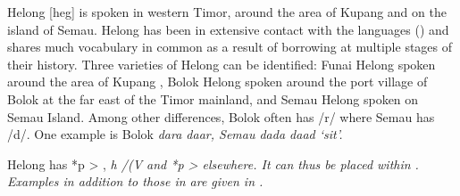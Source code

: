 Helong [heg] is spoken in western Timor,
around the area of Kupang
and on the island of Semau.
Helong has been in extensive contact with the 
languages () and shares much vocabulary in
common as a result of borrowing
at multiple stages of their history.
Three varieties of Helong can be identified: Funai Helong spoken
around the area of Kupang \citep{Edwards2018b},
Bolok Helong spoken around the port village of Bolok at the far
east of the Timor mainland,
and Semau Helong spoken on Semau Island.
Among other differences, Bolok often has /r/
where Semau has /d/. One example is Bolok
\it{dara {\tl} daar}, Semau \it{dada {\tl} daad} ‘sit’.

Helong has *p > {\0}, \it{h} /(V
and *p > {\0} elsewhere.
It can thus be placed within .
Examples in addition to those in 
are given in .

